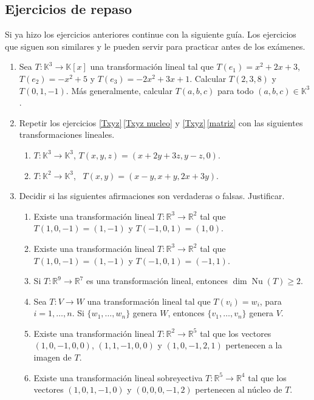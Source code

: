 \subsection*{Ejercicios de repaso}
Si ya hizo los ejercicios anteriores continue con la siguiente guía. Los ejercicios que siguen son similares y le pueden servir para practicar antes de los exámenes.

\begin{enumerate}[resume, topsep=5pt,itemsep=.4cm]
  \item Sea $T: \mathbb{K}^3\longrightarrow\mathbb{K}[x]$ una transformación lineal tal que $T(e_1)=x^2+2x+3$, $T(e_2)=-x^2+5$ y $T(e_3)=-2x^2+3x+1$. Calcular $T(2,3,8)$ y $T(0,1,-1)$. Más generalmente, calcular $T(a,b,c)$ para todo $(a,b,c)\in\mathbb{K}^3$.
  
  \item Repetir los ejercicios \ref{Txyz}\,\ref{Txyz nucleo} y \ref{Txyz}\,\ref{matriz} con las siguientes transformaciones lineales.
\begin{enumerate}[topsep=5pt,itemsep=5pt]
 \item $T:\mathbb{K}^3\longrightarrow\mathbb{K}^3$, $T(x,y,z)=(x+2y+3z, y-z,0)$.
 \item $T:\mathbb{K}^2 \longrightarrow \mathbb{K}^3$, \ $T(x,y)=(x-y,x+y,2x+3y)$.
\end{enumerate}    


\item Decidir si las siguientes afirmaciones son verdaderas o falsas. Justificar.

\begin{enumerate}
\item Existe una transformación lineal $T : \mathbb R^3 \to \mathbb R^2$ tal que $T(1, 0,-1) = (1, -1)$ y $T(-1, 0, 1) = (1, 0)$.
\item Existe una transformación lineal $T : \mathbb R^3 \to \mathbb R^2$ tal que $T(1, 0,-1) = (1, -1)$ y $T(-1, 0, 1) = (-1, 1)$.
\item  Si $T : \mathbb R^9 \to \mathbb R^7$ es una transformación lineal, entonces $\dim \operatorname{Nu}(T) \geq  2$.
\item Sea $T : V \to W$ una transformación lineal tal que $T(v_i) = w_i$, para $i = 1, \dots , n$. Si $\{w_1, \dots , w_n\}$ genera $W$, entonces
$\{v_1, \dots , v_n\}$ genera $V$.
\item Existe una transformación lineal $T : \mathbb R^2 \to \mathbb R^5$ tal que los vectores $(1, 0, -1, 0, 0)$, $(1, 1, -1, 0, 0)$ y $(1, 0, -1, 2, 1)$ pertenecen a la imagen de $T$.
\item Existe una transformación lineal sobreyectiva $T : \mathbb R^5 \to \mathbb R^4$ tal que los vectores $(1, 0, 1, -1, 0)$ y $(0, 0, 0, -1, 2)$
pertenecen al núcleo de $T$.
\end{enumerate}


\end{enumerate}
